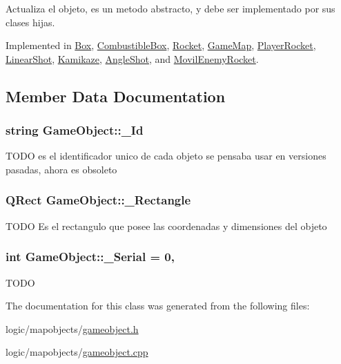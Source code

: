 Actualiza el objeto, es un metodo abstracto, y debe ser implementado por sus clases hijas. 



Implemented in \hyperlink{class_box_a779104150a6f06da2bf1500489a58530}{Box}, \hyperlink{class_combustible_box_ac3bcbb721576f4b00b0f2d7e48994657}{Combustible\-Box}, \hyperlink{class_rocket_aa0f4dcf673358e841e4b4b2fa0b1462e}{Rocket}, \hyperlink{class_game_map_a6497b5f848c5ac2945c0beabb896bead}{Game\-Map}, \hyperlink{class_player_rocket_a158f4ff0dd89fd4075688fa2b7d9e693}{Player\-Rocket}, \hyperlink{class_linear_shot_a7f0ae98813020ba9c1860f24750b6fcf}{Linear\-Shot}, \hyperlink{class_kamikaze_a9af97de13e4f0306c95124f56580a8aa}{Kamikaze}, \hyperlink{class_angle_shot_a15e9f45aedf1a47836b0c603a758dd20}{Angle\-Shot}, and \hyperlink{class_movil_enemy_rocket_af18f4b9b815e7fe4a3817845a644df40}{Movil\-Enemy\-Rocket}.



\subsection{Member Data Documentation}
\hypertarget{class_game_object_a74075bae5de6b22a17098e60964e676b}{
\subsubsection[{\-\_\-\-Id}]{\setlength{\rightskip}{0pt plus 5cm}string Game\-Object\-::\-\_\-\-Id\hspace{0.3cm}{\ttfamily [protected]}}}\label{class_game_object_a74075bae5de6b22a17098e60964e676b}
T\-O\-D\-O es el identificador unico de cada objeto se pensaba usar en versiones pasadas, ahora es obsoleto \hypertarget{class_game_object_a38a2dff83aae28ebffee5c4b833626a2}{
\subsubsection[{\-\_\-\-Rectangle}]{\setlength{\rightskip}{0pt plus 5cm}Q\-Rect Game\-Object\-::\-\_\-\-Rectangle\hspace{0.3cm}{\ttfamily [protected]}}}\label{class_game_object_a38a2dff83aae28ebffee5c4b833626a2}
T\-O\-D\-O Es el rectangulo que posee las coordenadas y dimensiones del objeto \hypertarget{class_game_object_aeeec17db7fc77fe70148a9d6edd99ea4}{
\subsubsection[{\-\_\-\-Serial}]{\setlength{\rightskip}{0pt plus 5cm}int Game\-Object\-::\-\_\-\-Serial = 0\hspace{0.3cm}{\ttfamily [static]}, {\ttfamily [protected]}}}\label{class_game_object_aeeec17db7fc77fe70148a9d6edd99ea4}
T\-O\-D\-O 

The documentation for this class was generated from the following files\-:\begin{DoxyCompactItemize}
\item 
logic/mapobjects/\hyperlink{gameobject_8h}{gameobject.\-h}\item 
logic/mapobjects/\hyperlink{gameobject_8cpp}{gameobject.\-cpp}\end{DoxyCompactItemize}
